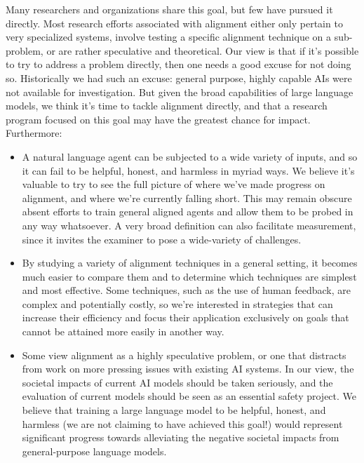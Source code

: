 Many researchers and organizations share this goal, but few have pursued it directly. Most research efforts associated with alignment either only pertain to very specialized systems, involve testing a specific alignment technique on a sub-problem, or are rather speculative and theoretical. Our view is that if it's possible to try to address a problem directly, then one needs a good excuse for not doing so. Historically we had such an excuse: general purpose, highly capable AIs were not available for investigation. But given the broad capabilities of large language models,  we think it's time to tackle alignment directly, and that a research program focused on this goal may have the greatest chance for impact.  Furthermore:

\begin{itemize}
\item A natural language agent can be subjected to a wide variety of inputs, and so it can fail to be helpful, honest, and harmless in myriad ways.  We believe it's valuable to try to see the full picture of where we've made progress on alignment, and where we're currently falling short.  This may remain obscure absent efforts to train general aligned agents and allow them to be probed in any way whatsoever.  A very broad definition can also facilitate measurement, since it invites the examiner to pose a wide-variety of challenges.  
\item  By studying a variety of alignment techniques in a general setting, it becomes much easier to compare them and to determine which techniques are simplest and most effective.  Some techniques, such as the use of human feedback, are complex and potentially costly, so we're interested in strategies that can increase their efficiency and focus their application exclusively on goals that cannot be attained more easily in another way.
\item  Some view alignment as a highly speculative problem, or one that distracts from work on more pressing issues with existing AI systems.  In our view, the societal impacts of current AI models should be taken seriously, and the evaluation of current models should be seen as an essential safety project.  We believe that training a large language model to be helpful, honest, and harmless (we are not claiming to have achieved this goal!) would represent significant progress towards alleviating the negative societal impacts from general-purpose language models.  

\end{itemize}
